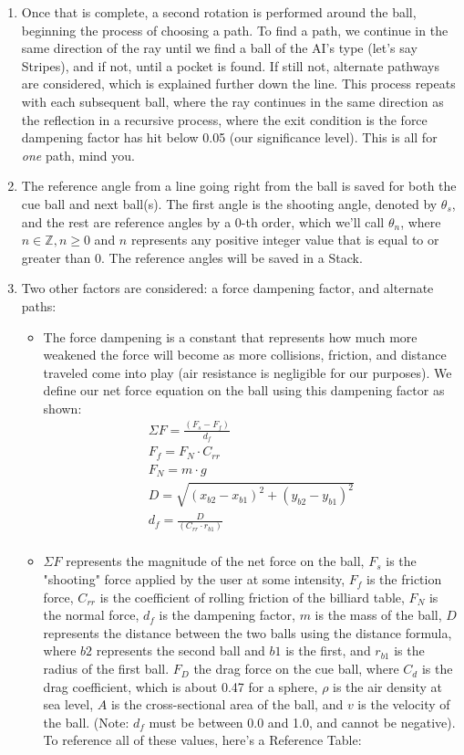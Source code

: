 \documentclass[12pt]{article}
\begin{document}
\begin{enumerate}
    \item Once that is complete, a second rotation is performed around the ball, beginning the process of choosing a path. To find a path, we continue in the same direction of the ray until we find a ball of the AI's type (let's say Stripes), and if not, until a pocket is found. If still not, alternate pathways are considered, which is explained further down the line. This process repeats with each subsequent ball, where the ray continues in the same direction as the reflection in a recursive process, where the exit condition is the force dampening factor has hit below 0.05 (our significance level). This is all for \textit{one} path, mind you.
    \item The reference angle from a line going right from the ball is saved for both the cue ball and next ball(s). The first angle is the shooting angle, denoted by $\theta_s$, and the rest are reference angles by a 0-th order, which we'll call $\theta_n$, where $n \in \mathbb{Z}, n\geq0$ and $n$ represents any positive integer value that is equal to or greater than 0. The reference angles will be saved in a Stack.
    \item Two other factors are considered: a force dampening factor, and alternate paths:
    \begin{itemize}
        \item The force dampening is a constant that represents how much more weakened the force will become as more collisions, friction, and distance traveled come into play (air resistance is negligible for our purposes). We define our net force equation on the ball using this dampening factor as shown:
        \begin{align}
        \Sigma F = \frac{(F_s - F_f)}{d_f} \\[1em]
        F_f = F_N \cdot C_{rr} \\
        F_N = m \cdot g \\[0.5em]
        D = \sqrt{(x_{b2}-x_{b1})^2 + (y_{b2}-y_{b1})^2} \\
        d_f = \frac{D}{(C_{rr} \cdot r_{b1})} \\
        \end{align}
        \item $\Sigma F$ represents the magnitude of the net force on the ball, $F_s$ is the "shooting" force applied by the user at some intensity, $F_f$ is the friction force, $C_{rr}$ is the coefficient of rolling friction of the billiard table, $F_N$ is the normal force, $d_f$ is the dampening factor, $m$ is the mass of the ball, $D$ represents the distance between the two balls using the distance formula, where $b2$ represents the second ball and $b1$ is the first, and $r_{b1}$ is the radius of the first ball. $F_D$ the drag force on the cue ball, where $C_d$ is the drag coefficient, which is about 0.47 for a sphere, $\rho$ is the air density at sea level, $A$ is the cross-sectional area of the ball, and $v$ is the velocity of the ball. (Note: $d_f$ must be between 0.0 and 1.0, and cannot be negative). To reference all of these values, here's a Reference Table:


\end{itemize}
\end{enumerate}
\end{document}
